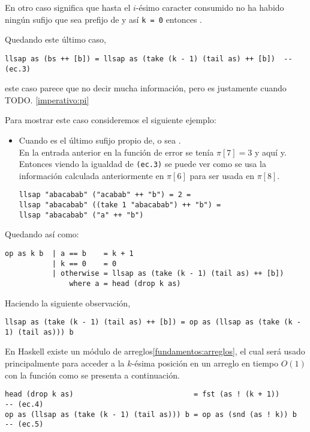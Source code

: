 En otro caso significa que hasta el $i$-ésimo caracter consumido no ha habido ningún sufijo que sea
prefijo de y así \texttt{k = 0} entonces .

Quedando este último caso,
\begin{verbatim}
llsap as (bs ++ [b]) = llsap as (take (k - 1) (tail as) ++ [b])  -- (ec.3)
\end{verbatim}
este caso parece que no decir mucha información, pero es justamente cuando TODO.
\ref{imperativo:pi}

Para mostrar este caso consideremos el siguiente ejemplo:
\begin{itemize}
\item Cuando es el último sufijo propio de, o sea .\\
En la entrada anterior en la función de error se tenía $\pi[7] = 3$ y aquí
y. Entonces viendo la igualdad de \texttt{(ec.3)} se puede ver como se
usa la información calculada anteriormente en $\pi[6]$ para ser usada en $\pi[8]$.
\begin{verbatim}    
llsap "abacabab" ("acabab" ++ "b") = 2 =
llsap "abacabab" ((take 1 "abacabab") ++ "b") =
llsap "abacabab" ("a" ++ "b")
\end{verbatim}
\end{itemize}

Quedando así  como:
\begin{verbatim}
op as k b  | a == b    = k + 1
           | k == 0    = 0
           | otherwise = llsap as (take (k - 1) (tail as) ++ [b])
               where a = head (drop k as)
\end{verbatim}

Haciendo la siguiente observación,
\begin{verbatim}
llsap as (take (k - 1) (tail as) ++ [b]) = op as (llsap as (take (k - 1) (tail as))) b
\end{verbatim}

En Haskell existe un módulo de arreglos\ref{fundamentos:arreglos}, el cual será usado
principalmente para acceder a la $k$-ésima posición en un arreglo en tiempo $O(1)$ con la función
\hsCode{(!)} como se presenta a continuación.

\begin{verbatim}
head (drop k as)                            = fst (as ! (k + 1))      -- (ec.4)
op as (llsap as (take (k - 1) (tail as))) b = op as (snd (as ! k)) b  -- (ec.5)
\end{verbatim}

